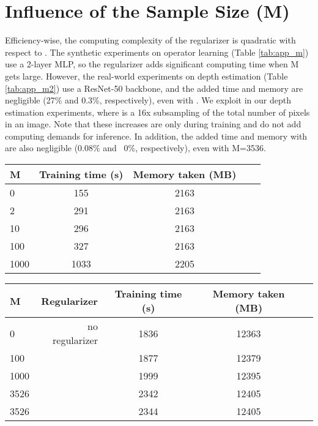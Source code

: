 \documentclass{article} \usepackage{iclr2023_conference,times}
\begin{document}
\section{Influence of the Sample Size (M)}
\label{app_m}


Efficiency-wise, the computing complexity of the regularizer is quadratic with respect to .  The synthetic experiments on operator learning (Table \ref{tab:app_m}) use a 2-layer MLP, so the regularizer adds significant computing time when M gets large. However, the real-world experiments on depth estimation (Table \ref{tab:app_m2}) use a ResNet-50 backbone, and the added time and memory are negligible (27\% and 0.3\%, respectively), even with . We exploit  in our depth estimation experiments, where  is a 16x subsampling of the total number of pixels in an image. Note that these increases are only during training and do not add computing demands for inference. In addition, the added time and memory with  are also negligible (0.08\% and ~0\%, respectively), even with M=3536.



\begin{table*}[h]
	\caption{Quantitative comparison of the time consumption and memory consumption on linear operator learning with synthetic data.}
	\label{tab:app_m}
	\centering
		\begin{tabular}{l|cccc}
			\hline
			\multirow{1}[0]{*}{M}
			& Training time (s) & Memory taken (MB)  \\
			\hline
			0 & 155 & 2163    \\
			2 & 291 & 2163    \\
			10 & 296 & 2163    \\
			100 & 327 & 2163   \\
			1000 & 1033 & 2205    \\			
			\hline
		\end{tabular}
\end{table*}

\begin{table*}[t]
	\caption{Quantitative comparison of the time consumption and memory consumption on depth estimation with NYU-v2. The training time is  one epoch training time.}
	\label{tab:app_m2}
	\centering
		\begin{tabular}{lr|ccc}
			\hline
			\multirow{1}[0]{*}{M}
			& Regularizer & Training time (s) & Memory taken (MB) \\
			\hline
			0 & no regularizer & 1836 & 12363   \\
			100 &  & 1877 & 12379   \\
			1000 &  & 1999 & 12395   \\
			3526  &  & 2342 & 12405   \\
			3526 &  & 2344 & 12405  \\
			\hline
		\end{tabular}
\end{table*}
\end{document}
